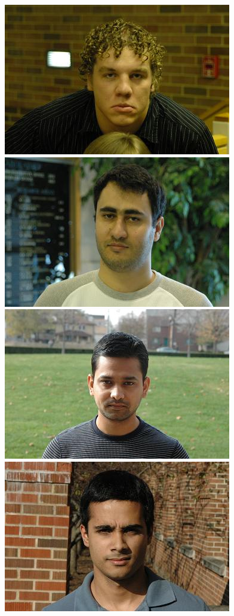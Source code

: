 \documentclass[10pt,journal,letterpaper,compsoc]{IEEEtran} %
\begin{document}
\begin{figure}
\includegraphics[scale=0.75,clip=true]{figures_pami/uiuc_example/normal_indoor/DSC_1941.JPG}
\includegraphics[scale=0.75,clip=true]{figures_pami/uiuc_example/normal_indoor/DSC_3766.JPG} \\
\vspace{2mm}
\centering
\includegraphics[scale=0.75,clip=true]{figures_pami/uiuc_example/normal_outdoor/DSC_1574.JPG}
\includegraphics[scale=0.75,clip=true]{figures_pami/uiuc_example/normal_outdoor/DSC_1622.JPG}

\end{figure}
\end{document}
